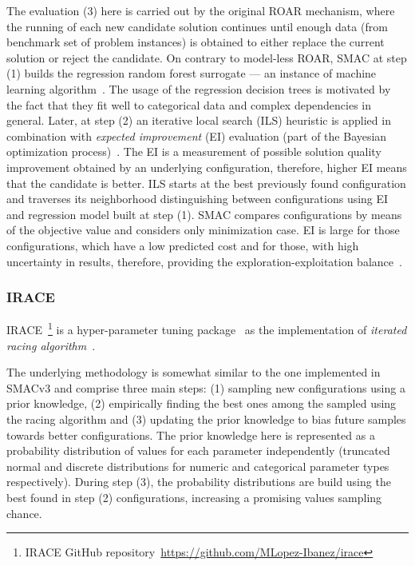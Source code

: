 The evaluation (3) here is carried out by the original ROAR mechanism, where the running of each new candidate solution continues until enough data (from benchmark set of problem instances) is obtained to either replace the current solution or reject the candidate. On contrary to model-less ROAR, SMAC at step (1) builds the regression random forest surrogate — an instance of machine learning algorithm~\cite{breiman2001random}. The usage of the regression decision trees is motivated by the fact that they fit well to categorical data and complex dependencies in general. Later, at step (2) an iterative local search (ILS) heuristic is applied in combination with \emph{expected improvement} (EI) evaluation (part of the Bayesian optimization process)~\cite{shahriari2015taking}. The EI is a measurement of possible solution quality improvement obtained by an underlying configuration, therefore, higher EI means that the candidate is better. ILS starts at the best previously found configuration and traverses its neighborhood distinguishing between configurations using EI and regression model built at step (1). SMAC compares configurations by means of the objective value and considers only minimization case. EI is large for those configurations, which have a low predicted cost and for those, with high uncertainty in results, therefore, providing the exploration-exploitation balance~\cite{jones1998efficient}.


\subsubsection{IRACE}\label{bg: irace}
IRACE~\footnote{IRACE GitHub repository~\url{https://github.com/MLopez-Ibanez/irace}} is a hyper-parameter tuning package~\cite{lopez2016irace} as the implementation of \emph{iterated racing algorithm}~\cite{birattari2010f}.

The underlying methodology is somewhat similar to the one implemented in SMACv3 and comprise three main steps: (1) sampling new configurations using a prior knowledge, (2) empirically finding the best ones among the sampled using the racing algorithm and (3) updating the prior knowledge to bias future samples towards better configurations. The prior knowledge here is represented as a probability distribution of values for each parameter independently (truncated normal and discrete distributions for numeric and categorical parameter types respectively). During step (3), the probability distributions are build using the best found in step (2) configurations, increasing a promising values sampling chance.

